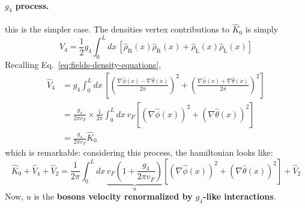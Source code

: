 \paragraph{$g_4$ process.} this is the simpler case. The densities vertex contributions to $\hat K_0$ is simply
\[
	\hat V_4 = \frac{1}{2} g_4 \int_0^L dx \, \left[ \hat \rho_\mathrm{R} (x) \hat \rho_\mathrm{R} (x) + \hat \rho_\mathrm{L} (x) \hat \rho_\mathrm{L} (x) \right]
\]
Recalling Eq.~\eqref{eq:fields-density-equations},
\[
\begin{aligned}
	\hat V_4 &= g_4 \int_0^L dx \, \left[ \left( \frac{\nabla \hat \phi(x) - \nabla \hat \theta(x)}{2\pi} \right)^2 + \left( \frac{\nabla \hat \phi(x) + \nabla \hat \theta(x)}{2\pi} \right)^2 \right] \\
	&= \frac{g_4}{2\pi v_F} \times \frac{1}{2\pi} \int_0^L dx \, v_F \left[ \left( \nabla \hat \phi(x) \right)^2 + \left( \nabla \hat \theta(x) \right)^2 \right] \\
	&= \frac{g_4}{2\pi v_F} \hat K_0
\end{aligned}
\]
which is remarkable: considering this process, the hamiltonian looks like:
\[
	\hat K_0 + \hat V_4 + \hat V_2 = \frac{1}{2\pi} \int_0^L dx \, \underbrace{v_F \left( 1 + \frac{g_4}{2\pi v_F} \right)}_{u} \left[ \left( \nabla \hat \phi(x) \right)^2 + \left( \nabla \hat \theta(x) \right)^2 \right] + \hat V_2
\]
Now, $u$ is the \textbf{bosons velocity renormalized by $g_4$-like interactions}.

